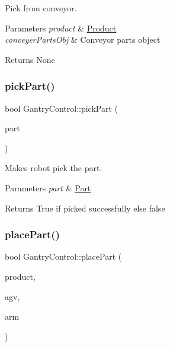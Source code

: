 Pick from conveyor. 


\begin{DoxyParams}{Parameters}
{\em product} & \hyperlink{structProduct}{Product} \\
\hline
{\em conveyer\+Parts\+Obj} & Conveyor parts object \\
\hline
\end{DoxyParams}
\begin{DoxyReturn}{Returns}
None 
\end{DoxyReturn}
\mbox{\label{classGantryControl_af9280bbee71d1ceca8aef3d616d48254}} 
\subsubsection{\texorpdfstring{pick\+Part()}{pickPart()}}
{\footnotesize\ttfamily bool Gantry\+Control\+::pick\+Part (\begin{DoxyParamCaption}\item[{\hyperlink{utils_8h_a67ee3a5b9091664130eca8efc8b97ab9}{part}}]{part }\end{DoxyParamCaption})}



Makes robot pick the part. 


\begin{DoxyParams}{Parameters}
{\em part} & \hyperlink{structPart}{Part} \\
\hline
\end{DoxyParams}
\begin{DoxyReturn}{Returns}
True if picked successfully else false 
\end{DoxyReturn}
\mbox{\label{classGantryControl_a0d0eb41f65891a98cae6f2a4a42d281a}} 
\subsubsection{\texorpdfstring{place\+Part()}{placePart()}}
{\footnotesize\ttfamily bool Gantry\+Control\+::place\+Part (\begin{DoxyParamCaption}\item[{\hyperlink{utils_8h_a48a7207852c0455cce7e65703b12ec7e}{product} \&}]{product,  }\item[{std\+::string}]{agv,  }\item[{std\+::string}]{arm }\end{DoxyParamCaption})}



